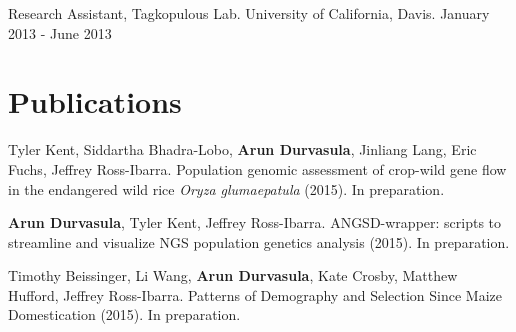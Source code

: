 \documentclass[letterpaper]{article}
\renewenvironment{itemize}{
  \begin{list}{}{
    \setlength{\leftmargin}{1em}
  }
}{
  \end{list}
}
\begin{document}
\begin{itemize}
\item Research Assistant, Tagkopulous Lab. University of California, Davis. \hfill January 2013 - June 2013
\end{itemize}

\section*{Publications}
\begin{itemize}
\item Tyler Kent, Siddartha Bhadra-Lobo, {\bf Arun Durvasula}, Jinliang Lang, Eric Fuchs, Jeffrey Ross-Ibarra. Population genomic assessment of crop-wild gene flow in the endangered wild rice \emph{Oryza glumaepatula} (2015). In preparation.
\item {\bf Arun Durvasula}, Tyler Kent, Jeffrey Ross-Ibarra. ANGSD-wrapper: scripts to streamline and visualize NGS population genetics analysis (2015). In preparation. %
\item Timothy Beissinger, Li Wang,  {\bf Arun Durvasula}, Kate Crosby, Matthew Hufford, Jeffrey Ross-Ibarra. Patterns of Demography and Selection Since Maize Domestication (2015). In preparation.
\end{itemize}
\end{document}
